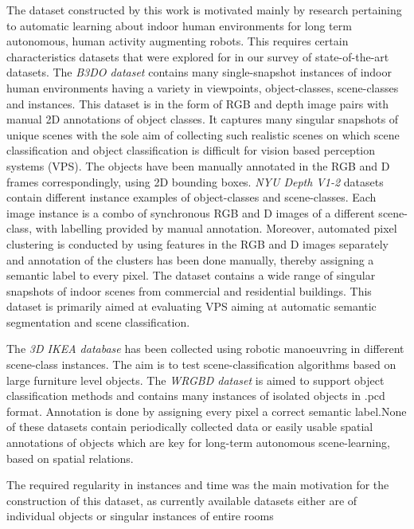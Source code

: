 \documentclass[letterpaper, 10 pt, conference]{ieeeconf}  %
\begin{document}
The dataset constructed by this work is motivated mainly by research pertaining to automatic learning about indoor human environments for long term autonomous, human activity augmenting robots. This requires certain characteristics datasets that were explored for in our survey of state-of-the-art datasets. The \textit{B3DO dataset} \cite{Janoch:ICCV2011} contains many single-snapshot instances of indoor human environments having a variety in viewpoints, object-classes, scene-classes and instances. This dataset is in the form of RGB and depth image pairs with manual 2D annotations of object classes. It captures many singular snapshots of unique scenes with the sole aim of collecting such realistic scenes on which scene classification and object classification is difficult for vision based perception systems (VPS). The objects have been manually annotated in the RGB and D frames correspondingly, using 2D bounding boxes. \textit{NYU Depth V1-2} \cite{Silberman:ECCV2012} datasets contain different instance examples of object-classes and scene-classes. Each image instance is a combo of synchronous RGB and D images of a different scene-class, with labelling provided by manual annotation. Moreover, automated pixel clustering is conducted by using features in the RGB and D images separately and annotation of the clusters has been done manually, thereby assigning a semantic label to every pixel. The dataset contains a wide range of singular snapshots of indoor scenes from commercial and residential buildings. This dataset is primarily aimed at evaluating VPS aiming at automatic semantic segmentation and scene classification. 

The \textit{3D IKEA database} \cite{Swadzba:RAS2012} has been collected using robotic manoeuvring in different scene-class instances. The aim is to test scene-classification algorithms based on large furniture level objects. The \textit{WRGBD dataset} \cite{Lai:ICRA2011} is aimed to support object classification methods and contains many instances of isolated objects in .pcd format. Annotation is done by assigning every pixel a correct semantic label.None of these datasets contain periodically collected data or easily usable spatial annotations of objects which are key for long-term autonomous scene-learning, based on spatial relations.

The required regularity in instances and time was the main motivation for the construction of this dataset, as currently available datasets either are of individual objects or singular instances of entire rooms
\end{document}
